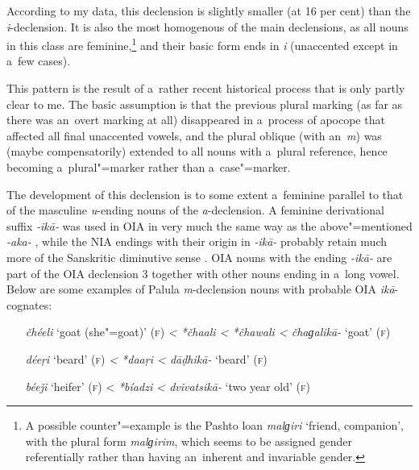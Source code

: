 According to my data, this declension is slightly smaller (at 16 per cent) than the \textit{i}-declension. It is also the most homogenous of the main declensions, as all nouns in this class are feminine,\footnote{A possible counter"=example is the Pashto loan \textit{malɡiri} `friend, companion', with the plural form \textit{malɡirim}, which seems to be assigned gender referentially rather than having an~inherent and invariable gender.} and their basic form ends in \textit{i} (unaccented except in a~few cases).


This pattern is the result of a~rather recent historical process that is only partly clear to me. The basic assumption is that the previous plural marking (as far as there was an~overt marking at all) disappeared in a~process of apocope that affected all final unaccented vowels, and the plural oblique (with an~\textit{m}) was (maybe compensatorily) extended to all nouns with a~plural reference, hence becoming a~plural"=marker rather than a~case"=marker.


The development of this declension is to some extent a~feminine parallel to that of the masculine \textit{u}-ending nouns of the \textit{a}-declension. A feminine derivational suffix \textit{-ikā-} was used in OIA in very much the same way as the above"=mentioned \textit{-aka-} \citep[1222]{whitney1960}, while the NIA endings with their origin in \textit{-ikā-} probably retain much more of the Sanskritic diminutive sense \citep[222]{masica1991}. OIA nouns with the ending \textit{-ikā-} are part of the OIA declension 3 together with other nouns ending in a~long vowel. Below are some examples of Palula \textit{m}-declension nouns with probable OIA \textit{ikā}-cognates: 


\begin{itemize}[leftmargin=]
\item[\textit{čhéeli} `goat (she"=goat)' (\textsc{f})] \textit{{\textless} *čhaali {\textless} *čhawali {\textless} čhaɡalikā-} `goat' (\textsc{f})
\item[\textit{déeṛi} `beard' (\textsc{f})] \textit{{\textless} *daaṛi {\textless} dāḍhikā-} `beard' (\textsc{f})
\item[\textit{béeǰi} `heifer' (\textsc{f})] {\textless} \textit{*bíadzi {\textless} dvivatsikā-} `two year old' (\textsc{f})
\end{itemize}

